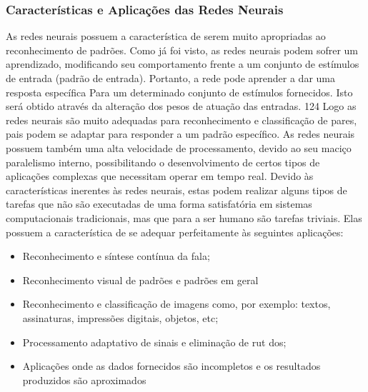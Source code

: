		\subsubsection{Características e Aplicações das Redes Neurais}
		
			As redes neurais possuem a característica de serem muito apropriadas ao reconhecimento de padrões. Como já foi visto, as redes neurais podem sofrer um aprendizado, modificando seu comportamento frente a um conjunto de estímulos de entrada (padrão de entrada). Portanto, a rede pode aprender a dar uma resposta específica Para um determinado conjunto de estímulos fornecidos. Isto será obtido através da alteração dos pesos de atuação das entradas. 124 Logo as redes neurais são muito adequadas para reconhecimento e classificação de pares, pais podem se adaptar para responder a um padrão específico. As redes neurais possuem também uma alta velocidade de processamento, devido ao seu maciço paralelismo interno, possibilitando o desenvolvimento de certos tipos de aplicações complexas que necessitam operar em tempo real. Devido às características inerentes às redes neurais, estas podem realizar alguns tipos de tarefas que não são executadas de uma forma satisfatória em sistemas computacionais tradicionais, mas que para a ser humano são tarefas triviais. Elas possuem a característica de se adequar perfeitamente às seguintes aplicações:
			
			\begin{itemize}
				\item Reconhecimento e síntese contínua da fala;
				\item Reconhecimento visual de padrões e padrões em geral 
				\item Reconhecimento e classificação de imagens como, por exemplo: textos, assinaturas, impressões digitais, objetos, etc;
				\item Processamento adaptativo de sinais e eliminação de rut dos;
				\item Aplicações onde as dados fornecidos são incompletos e os resultados produzidos são aproximados
			\end{itemize}